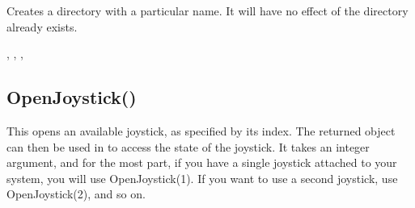 \documentclass[letterpaper,10pt,english]{sphinxmanual}
\begin{document}
\sphinxAtStartPar
Creates a directory with a particular name. It will have no effect of the directory already exists.

\sphinxAtStartPar
{}

\begin{sphinxVerbatim}[commandchars=\\\{\}]
\end{sphinxVerbatim}

\sphinxAtStartPar
{}

\begin{sphinxVerbatim}[commandchars=\\\{\}]
\end{sphinxVerbatim}

\sphinxAtStartPar
{}

\sphinxAtStartPar
{}, ,       ,            

\ignorespaces 

\subsection{OpenJoystick()}
\label{\detokenize{reference/peblenvironment:openjoystick}}\label{\detokenize{reference/peblenvironment:index-54}}
\sphinxAtStartPar
{}

\sphinxAtStartPar
{}

\sphinxAtStartPar
This opens an available joystick, as specified by its index.  The returned object can then be used in to access the state of the joystick.  It takes an integer argument, and for the most part, if you have a single joystick attached to your system, you will use OpenJoystick(1).  If you want to use a second joystick, use OpenJoystick(2), and so on.
\end{document}
